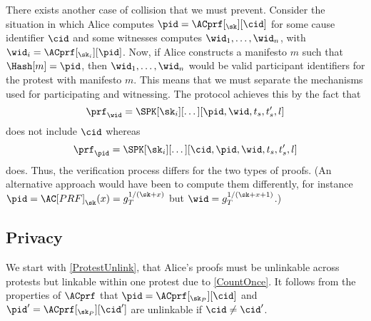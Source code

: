 There exists another case of collision that we must prevent.
Consider the situation in which Alice computes \(\pid = \ACprf[_\sk][\cid]\) for some cause identifier \(\cid\) and some witnesses computes \(\wid_1, \dotsc, \wid_n\), with \(\wid_i = \ACprf[_{\sk_i}][\pid]\).
Now, if Alice constructs a manifesto \(m\) such that \(\Hash[m] = \pid\), then \(\wid_1, \dotsc, \wid_n\) would be valid participant identifiers for the protest with manifesto \(m\).
This means that we must separate the mechanisms used for participating and witnessing.
The protocol achieves this by the fact that \[
  \prf_{\wid} = \SPK[\sk_i][\dotsc][\pid, \wid, t_s, t_s', l]
\]
does not include \(\cid\) whereas \[
  \prf_{\pid} = \SPK[\sk_i][\dotsc][\cid, \pid, \wid, t_s, t_s', l]
\]
does.
Thus, the verification process differs for the two types of proofs.
(An alternative approach would have been to compute them differently, for instance \(\pid = \AC[PRF]_{\sk}(x) = g_T^{1/(\sk+x)}\) but \(\wid = g_T^{1/(\sk+x+1)}\).)

%
%

\subsection{Privacy}

We start with \cref{ProtestUnlink}, that Alice's proofs must be unlinkable across protests but linkable within one protest due to \cref{CountOnce}.
It follows from the properties of \(\ACprf\) that \(\pid =  \ACprf[_{\sk_P}][\cid]\) and \(\pid' = \ACprf[_{\sk_P}][\cid']\) are unlinkable if \(\cid\neq \cid'\).

